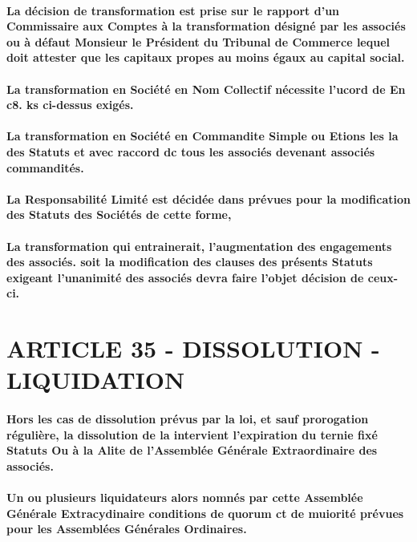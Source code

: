\documentclass[a4paper, 11pt]{article}
\begin{document}
\paragraph{
  La décision de transformation est prise sur le rapport d'un Commissaire aux Comptes à la transformation désigné par les associés ou à défaut Monsieur le Président du Tribunal de Commerce lequel doit attester que les capitaux propes au moins égaux au capital social.
}

\paragraph{
  La transformation en Société en Nom Collectif nécessite l'ucord de En c8. ks ci-dessus exigés.
}

\paragraph{
  La transformation en Société en Commandite Simple ou Etions les la des Statuts et avec raccord dc tous les associés devenant associés commandités.
}

\paragraph{
  La Responsabilité Limité est décidée dans prévues pour la modification des Statuts des Sociétés de cette forme,
}

\paragraph{
  La transformation qui entrainerait, l'augmentation des engagements des associés. soit la modification des clauses des présents Statuts exigeant l'unanimité des associés devra faire l'objet décision de ceux-ci.
}

\section*{ARTICLE 35 - DISSOLUTION - LIQUIDATION}

\paragraph{
  Hors les cas de dissolution prévus par la loi, et sauf prorogation régulière, la dissolution de la intervient l'expiration du ternie fixé Statuts Ou à la Alite de l'Assemblée Générale Extraordinaire des associés.
}
\paragraph{
  Un ou plusieurs liquidateurs alors nomnés par cette Assemblée Générale Extracydinaire conditions de quorum ct de muiorité prévues pour les Assemblées Générales Ordinaires.
}
\end{document}

